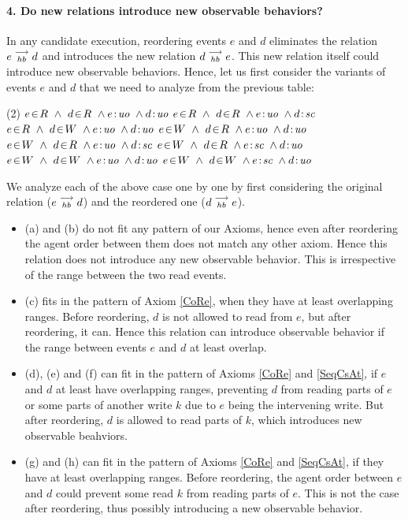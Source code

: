 
\paragraph{4. Do new relations introduce new observable behaviors?}
    In any candidate execution, reordering events $e$ and $d$ eliminates the relation $e\stackrel{\longrightarrow}{_{hb}}d$ and introduces the new relation $d\stackrel{\longrightarrow}{_{hb}}e$.
    This new relation itself could introduce new observable behaviors.  
    Hence, let us first consider the variants of events $e$ and $d$ that we need to analyze from the previous table:
    \begin{tasks}(2)
        \task $\event{e}{R} \ \wedge \ \event{d}{R} \ \wedge \et{e}{uo} \ \wedge \et{d}{uo}$
        \task $\event{e}{R} \ \wedge \ \event{d}{R} \ \wedge \et{e}{uo} \ \wedge \et{d}{sc}$
        \task $\event{e}{R} \ \wedge \ \event{d}{W} \ \wedge \et{e}{uo} \ \wedge \et{d}{uo}$
        \task $\event{e}{W} \ \wedge \ \event{d}{R} \ \wedge \et{e}{uo} \ \wedge \et{d}{uo}$
        \task $\event{e}{W} \ \wedge \ \event{d}{R} \ \wedge \et{e}{uo} \ \wedge \et{d}{sc}$
        \task $\event{e}{W} \ \wedge \ \event{d}{R} \ \wedge \et{e}{sc} \ \wedge \et{d}{uo}$
        \task $\event{e}{W} \ \wedge \ \event{d}{W} \ \wedge \et{e}{uo} \ \wedge \et{d}{uo}$
        \task $\event{e}{W} \ \wedge \ \event{d}{W} \ \wedge \et{e}{sc} \ \wedge \et{d}{uo}$
    \end{tasks}

    We analyze each of the above case one by one by first considering the original relation ($e\stackrel{\longrightarrow}{_{hb}}d$) and the reordered one ($d\stackrel{\longrightarrow}{_{hb}}e$). 
    \begin{itemize}
        \item (a) and (b) do not fit any pattern of our Axioms, hence even after reordering the agent order between them does not match any other axiom. Hence this relation does not introduce any new observable behavior. This is irrespective of the range between the two read events.
        \item (c) fits in the pattern of Axiom \ref{CoRe}, when they have at least overlapping ranges. Before reordering, $d$ is not allowed to read from $e$, but after reordering, it can. Hence this relation can introduce observable behavior if the range between events $e$ and $d$ at least overlap. 
        \item (d), (e) and (f) can fit in the pattern of Axioms \ref{CoRe} and \ref{SeqCsAt}, if $e$ and $d$ at least have overlapping ranges, preventing $d$ from reading parts of $e$ or some parts of another write $k$ due to $e$ being the intervening write. But after reordering, $d$ is allowed to read parts of $k$, which introduces new observable beahviors.
        \item (g) and (h) can fit in the pattern of Axioms \ref{CoRe} and \ref{SeqCsAt}, if they have at least overlapping ranges. Before reordering, the agent order between $e$ and $d$ could prevent some read $k$ from reading parts of $e$. This is not the case after reordering, thus possibly introducing a new observable behavior. 
    \end{itemize}

